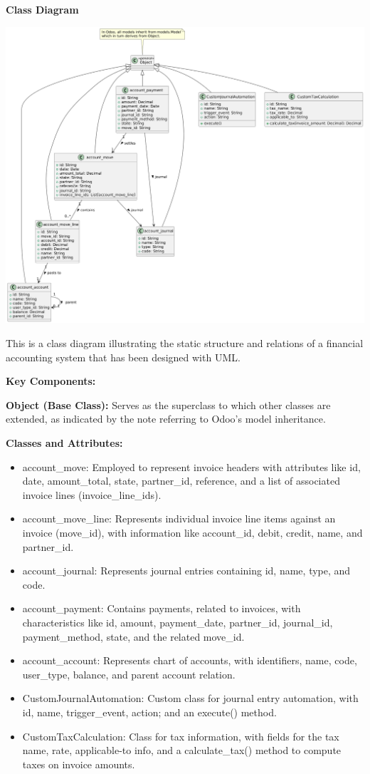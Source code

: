 \documentclass[11pt,a4paper]{article}
\begin{document}
\noindent\textbf{Class Diagram}
\begin{center}
    \includegraphics[width=\linewidth]{diagram/class_diagram_account.png}
\end{center}

\noindent This is a class diagram illustrating the static structure and relations of a financial accounting system that has been designed with UML.
\medskip

\noindent\textbf{Key Components:}

\noindent\textbf{Object (Base Class):}
\noindent Serves as the superclass to which other classes are extended, as indicated by the note referring to Odoo's model inheritance.

\noindent\textbf{Classes and Attributes:}
\begin{itemize}
    \item account\_move: Employed to represent invoice headers with attributes like id, date, amount\_total, state, partner\_id, reference, and a list of associated invoice lines (invoice\_line\_ids).
    \item account\_move\_line: Represents individual invoice line items against an invoice (move\_id), with information like account\_id, debit, credit, name, and partner\_id.
    \item account\_journal: Represents journal entries containing id, name, type, and code.
    \item account\_payment: Contains payments, related to invoices, with characteristics like id, amount, payment\_date, partner\_id, journal\_id, payment\_method, state, and the related move\_id.
    \item account\_account: Represents chart of accounts, with identifiers, name, code, user\_type, balance, and parent account relation.
    \item CustomJournalAutomation: Custom class for journal entry automation, with id, name, trigger\_event, action; and an execute() method.
    \item CustomTaxCalculation: Class for tax information, with fields for the tax name, rate, applicable-to info, and a calculate\_tax() method to compute taxes on invoice amounts.
\end{itemize}
\medskip
\end{document}
